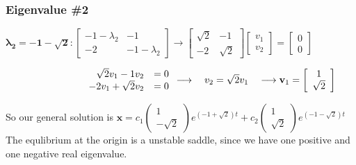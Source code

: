 \documentclass[12pt]{article}
\begin{document}
\begin{enumerate}
    \subsubsection*{Eigenvalue \#2}
    $\mathbf{\lambda_2 = -1 - \sqrt{2}}: 
    \left[\begin{array}{cc} -1 - \lambda_2 & -1\\ -2 & -1 - \lambda_2\end{array}\right]
    \rightarrow \left[\begin{array}{rr} \sqrt{2} & -1\\ -2 & \sqrt{2} \end{array}\right] \left[\begin{array}{cc} v_1 \\ v_2 \end{array}\right] = \left[\begin{array}{cc} 0 \\ 0 \end{array}\right]$

    $\hspace*{2.8cm}\begin{array}{rr} \sqrt{2}v_1 - 1v_2 &=0 \\ -2v_1 + \sqrt{2}v_2 &=0 \end{array} 
     \longrightarrow \quad v_2=\sqrt{2}v_1 \quad \longrightarrow \mathbf{v}_1 =\left[\begin{array}{cc} 1 \\ \sqrt{2} \end{array}\right]$

    So our general solution is $\mathbf{x} = c_1\begin{pmatrix} 1 \\ -\sqrt{2} \end{pmatrix}e^{(-1 + \sqrt{2})t} + c_2\begin{pmatrix} 1 \\ \sqrt{2} \end{pmatrix}e^{(-1 - \sqrt{2})t}$ \\
    The equlibrium at the origin is a unstable saddle, since we have one positive and one negative real eigenvalue. \\
    
    \vspace{12cm}


\end{enumerate}
\end{document}
